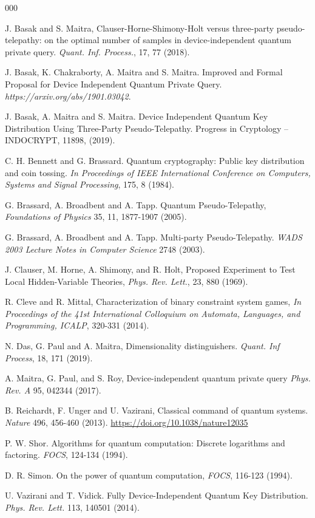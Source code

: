 \documentclass[]{svjour3}
\begin{document}
\newpage
\begin{thebibliography}{000}
	
	J. Basak and S. Maitra, 
	Clauser-Horne-Shimony-Holt versus three-party pseudo-telepathy: on the optimal number of samples in device-independent quantum private query. 
	{\it Quant. Inf. Process.}, {17}, 77 (2018).
	
	
	J. Basak, K. Chakraborty, A. Maitra and S. Maitra.
	Improved and Formal Proposal for Device Independent Quantum Private Query.
	{\it https://arxiv.org/abs/1901.03042}.
	
	
	 J. Basak, A. Maitra and S. Maitra. 
	 Device Independent Quantum Key Distribution Using Three-Party Pseudo-Telepathy. 
	 Progress in Cryptology – INDOCRYPT, 11898, (2019).
	
	
	C. H. Bennett and G. Brassard. 
	Quantum cryptography: Public key distribution and coin tossing. 
	{\it In Proceedings of IEEE International Conference on Computers, Systems and Signal Processing}, 175, 8 (1984).
	
	G. Brassard, A. Broadbent and A. Tapp. Quantum Pseudo-Telepathy, {\it Foundations of Physics} 35, 11, 1877-1907 (2005).
	
	G. Brassard, A. Broadbent and A. Tapp.  Multi-party Pseudo-Telepathy. 
	{\it WADS 2003 Lecture Notes in Computer Science} 2748 (2003).
	
	J. Clauser, M. Horne, A. Shimony, and R. Holt, Proposed Experiment to Test Local Hidden-Variable Theories, {\it Phys. Rev. Lett.}, 23, 880 (1969).
	
	
	
	R. Cleve and R. Mittal, Characterization of binary constraint system games, {\it In Proceedings of the 41st International Colloquium on Automata, Languages, and Programming, ICALP}, 320-331 (2014).
	
	
	N. Das, G. Paul and A. Maitra, Dimensionality distinguishers. {\it Quant. Inf Process}, 18, 171 (2019).
	
	
	A. Maitra, G. Paul, and S. Roy,
	Device-independent quantum private query
	{\it Phys. Rev. A} 95, 042344 (2017).
	
	B. Reichardt, F. Unger and U. Vazirani, Classical command of quantum systems. {\it Nature} 496, 456-460 (2013).
	\url{https://doi.org/10.1038/nature12035}
	
	
	P. W. Shor. 
	Algorithms for quantum computation: Discrete logarithms and factoring. {\it FOCS}, 124-134 (1994).
	
	D. R. Simon. 
	On the power of quantum computation, {\it FOCS}, 116-123 (1994).
	
	
	U. Vazirani and T. Vidick.
	Fully Device-Independent Quantum Key Distribution.
	{\it Phys. Rev. Lett.} 113, 140501 (2014).
	 
	
	
\end{thebibliography}
\end{document}
